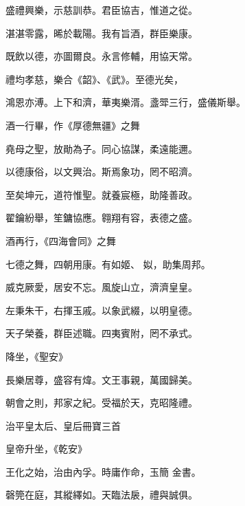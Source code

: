 \begin{pinyinscope}
 盛禮興樂，示慈訓恭。君臣協吉，惟道之從。



 湛湛零露，晞於載陽。我有旨酒，群臣樂康。



 既飲以德，亦圖爾良。永言修輔，用協天常。



 禮均孝慈，樂合《韶》、《武》。至德光矣，



 鴻恩亦溥。上下和濟，華夷樂湑。盞斝三行，盛儀斯舉。



 酒一行畢，作《厚德無疆》之舞



 堯母之聖，放勛為子。同心協謀，柔遠能邇。



 以德康俗，以文興治。斯焉象功，罔不昭濟。



 至矣坤元，道符惟聖。就養宸極，助隆善政。



 翟鑰紛舉，笙鏞協應。翱翔有容，表德之盛。



 酒再行，《四海會同》之舞



 七德之舞，四朝用康。有如姬、
 姒，助集周邦。



 威克厥愛，居安不忘。風旋山立，濟濟皇皇。



 左秉朱干，右揮玉戚。以象武綴，以明皇德。



 天子榮養，群臣述職。四夷賓附，罔不承式。



 降坐，《聖安》



 長樂居尊，盛容有煒。文王事親，萬國歸美。



 朝會之則，邦家之紀。受福於天，克昭隆禮。



 治平皇太后、皇后冊寶三首



 皇帝升坐，《乾安》



 王化之始，治由內孚。時庸作命，玉簡
 金書。



 磬筦在庭，其縱繹如。天臨法扆，禮與誠俱。




\end{pinyinscope}
